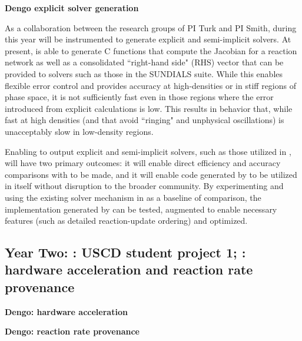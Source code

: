 \noindent \textbf{Dengo explicit solver generation}

As a collaboration between the research groups of PI Turk and PI Smith, during
this year \dengo{} will be instrumented to generate explicit and semi-implicit
solvers.  At present, \dengo{} is able to generate C functions that compute the
Jacobian for a reaction network as well as a consolidated ``right-hand side"
(RHS)
vector that can be provided to solvers such as those in the SUNDIALS suite.
While this enables flexible error control and provides accuracy at
high-densities or in stiff regions of phase space, it is not sufficiently fast
even in those regions where the error introduced from explicit calculations is
low.  This results in behavior that, while fast at high densities (and that
avoid ``ringing" and unphysical oscillations) is unacceptably slow in
low-density regions.

Enabling \dengo{} to output explicit and semi-implicit solvers, such as those
utilized in \grackle{}, will have two primary outcomes: it will enable direct
efficiency and accuracy comparisons with \grackle{} to be made, and it will
enable code generated by \dengo{} to be utilized in \grackle{} itself without
disruption to the broader community.  By experimenting and using the
existing solver mechanism in \grackle{} as a baseline of comparison, the
implementation generated by \dengo{} can be tested, augmented to enable
necessary features (such as detailed reaction-update ordering) and optimized.

\subsection{Year Two: \grackle{}: USCD student project 1; \dengo{}:
  hardware acceleration and reaction rate provenance}

\noindent \textbf{Dengo: hardware acceleration}

\noindent \textbf{Dengo: reaction rate provenance}

